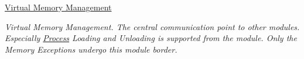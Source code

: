 \begin{CompactItemize}
\item 
\hyperlink{group___v_m_m}{Virtual Memory Management}
\begin{CompactList}\small\item\em Virtual Memory Management. The central communication point to other modules. Especially \hyperlink{struct_process}{Process} Loading and Unloading is supported from the module. Only the Memory Exceptions undergo this module border. \item\end{CompactList}

\end{CompactItemize}
